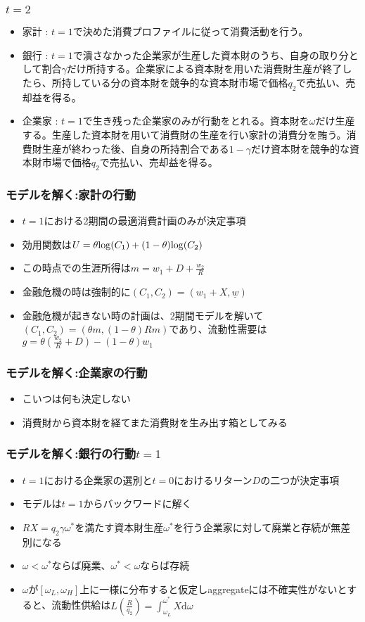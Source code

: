 \documentclass[dvipdfmx, 12pt]{beamer}
\begin{document}
\begin{frame}\frametitle{$t = 2$}
	\begin{itemize}
		\item 家計 : $t=1$で決めた消費プロファイルに従って消費活動を行う。
		\item 銀行 : $t = 1$で潰さなかった企業家が生産した資本財のうち、自身の取り分として割合$\gamma$だけ所持する。企業家による資本財を用いた消費財生産が終了したら、所持している分の資本財を競争的な資本財市場で価格$q_2$で売払い、売却益を得る。
		\item 企業家 : $t = 1$で生き残った企業家のみが行動をとれる。資本財を$\omega$だけ生産する。生産した資本財を用いて消費財の生産を行い家計の消費分を賄う。消費財生産が終わった後、自身の所持割合である$1-\gamma$だけ資本財を競争的な資本財市場で価格$q_2$で売払い、売却益を得る。
	\end{itemize}
\end{frame}

\begin{frame}\frametitle{モデルを解く:家計の行動}
	\begin{itemize}
		\item $t = 1$における2期間の最適消費計画のみが決定事項
		\item 効用関数は$U = \theta {\rm log}(C_1) + (1 - \theta){\rm log}(C_2)$
		\item この時点での生涯所得は$m = w_1 + D + \frac{w_2}{R}$
		\item 金融危機の時は強制的に$(C_1, C_2) = (w_1+X, \underline{w})$
		\item 金融危機が起きない時の計画は、2期間モデルを解いて$(C_1, C_2) = (\theta m, (1-\theta)Rm)$であり、流動性需要は$g = \theta \left( \frac{w_2}{R} + D\right) - (1-\theta)w_1$
	\end{itemize}
\end{frame}

\begin{frame}\frametitle{モデルを解く:企業家の行動}
	\begin{itemize}
		\item こいつは何も決定しない
		\item 消費財から資本財を経てまた消費財を生み出す箱としてみる
	\end{itemize}
\end{frame}

\begin{frame}\frametitle{モデルを解く:銀行の行動$t = 1$}
	\begin{itemize}
		\item $t = 1$における企業家の選別と$t = 0$におけるリターン$D$の二つが決定事項
		\item モデルは$t=1$からバックワードに解く
		\item $RX = q_2\gamma \omega^*$を満たす資本財生産$\omega^*$を行う企業家に対して廃業と存続が無差別になる
		\item $\omega < \omega^*$ならば廃業、$\omega^* < \omega$ならば存続
		\item $\omega$が$[\omega_L, \omega_H]$上に一様に分布すると仮定しaggregateには不確実性がないとすると、流動性供給は$L(\frac{R}{q_2}) = \int_{\omega_L}^{\omega^*}X\mathrm{d}\omega$
	\end{itemize}
\end{frame}
\end{document}
